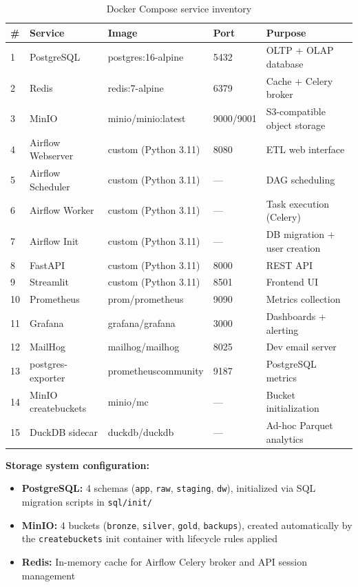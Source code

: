 \documentclass[a4paper,11pt,oneside,openany]{report}
\begin{document}
\begin{table}[H]
\centering
\caption{Docker Compose service inventory}
\label{tab:services}
\begin{tabularx}{\textwidth}{C{0.5cm} L{3cm} L{2.5cm} C{1.5cm} L{4.5cm}}
\toprule
\textbf{\#} & \textbf{Service} & \textbf{Image} & \textbf{Port} & \textbf{Purpose} \\
 & PostgreSQL & postgres:16-alpine & 5432 & OLTP + OLAP database \\
2 & Redis & redis:7-alpine & 6379 & Cache + Celery broker \\
3 & MinIO & minio/minio:latest & 9000/9001 & S3-compatible object storage \\
4 & Airflow Webserver & custom (Python 3.11) & 8080 & ETL web interface \\
5 & Airflow Scheduler & custom (Python 3.11) & --- & DAG scheduling \\
6 & Airflow Worker & custom (Python 3.11) & --- & Task execution (Celery) \\
7 & Airflow Init & custom (Python 3.11) & --- & DB migration + user creation \\
8 & FastAPI & custom (Python 3.11) & 8000 & REST API \\
9 & Streamlit & custom (Python 3.11) & 8501 & Frontend UI \\
10 & Prometheus & prom/prometheus & 9090 & Metrics collection \\
11 & Grafana & grafana/grafana & 3000 & Dashboards + alerting \\
12 & MailHog & mailhog/mailhog & 8025 & Dev email server \\
13 & postgres-exporter & prometheuscommunity & 9187 & PostgreSQL metrics \\
14 & MinIO createbuckets & minio/mc & --- & Bucket initialization \\
15 & DuckDB sidecar & duckdb/duckdb & --- & Ad-hoc Parquet analytics \\
\bottomrule
\end{tabularx}
\end{table}

\textbf{Storage system configuration:}
\begin{itemize}[nosep]
  \item \textbf{PostgreSQL:} 4 schemas (\texttt{app}, \texttt{raw}, \texttt{staging},
        \texttt{dw}), initialized via SQL migration scripts in \texttt{sql/init/}
  \item \textbf{MinIO:} 4 buckets (\texttt{bronze}, \texttt{silver}, \texttt{gold},
        \texttt{backups}), created automatically by the \texttt{createbuckets}
        init container with lifecycle rules applied
  \item \textbf{Redis:} In-memory cache for Airflow Celery broker and API
        session management
\end{itemize}
\end{document}
